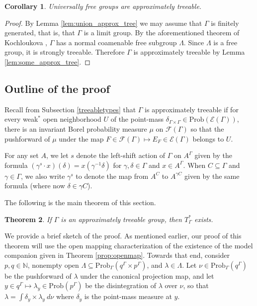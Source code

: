 \documentclass[12pt]{amsart}
\newtheorem{thm}{Theorem}[section]
\newtheorem{cor}[thm]{Corollary}
\theoremstyle{definition}
\def\cal{\mathcal}
\newcommand\bN{{\mathbb N}}
\newcommand{\Prob}{\mathrm{Prob}}
\begin{document}
\begin{cor}
    Universally free groups are approximately treeable.
\end{cor}

\begin{proof}
    By Lemma \ref{lem:union_approx_tree} we may assume that $\Gamma$ is finitely generated, that is, that $\Gamma$ is a limit group.  By the aforementioned theorem of Kochloukova \cite{Kochloukova}, $\Gamma$ has a normal coamenable free subgroup $\Lambda$. Since $\Lambda$ is a free group, it is strongly treeable. Therefore $\Gamma$ is approximately treeable by Lemma \ref{lem:some_approx_tree}.
\end{proof}

\subsection{Outline of the proof}

Recall from Subsection \ref{treeabletypes} that $\Gamma$ is approximately treeable if for every weak$^*$ open neighborhood $U$ of the point-mass $\delta_{\Gamma \times \Gamma} \in \Prob(\cal E(\Gamma))$, there is an invariant Borel probability measure $\mu$ on $\cal F(\Gamma)$ so that the pushforward of $\mu$ under the map $F \in \cal F(\Gamma) \mapsto E_F \in \cal E(\Gamma)$ belongs to $U$.

For any set $A$, we let $s$ denote the left-shift action of $\Gamma$ on $A^\Gamma$ given by the formula $(\gamma^s \cdot x)(\delta) = x(\gamma^{-1} \delta)$ for $\gamma, \delta \in \Gamma$ and $x \in A^\Gamma$. When $C \subseteq \Gamma$ and $\gamma \in \Gamma$, we also write $\gamma^s$ to denote the map from $A^C$ to $A^{\gamma C}$ given by the same formula (where now $\delta \in \gamma C$).

The following is the main theorem of this section.

\begin{thm} \label{thm:approxtree}
	If $\Gamma$ is an approximately treeable group, then $T_\Gamma^*$ exists.
\end{thm}

We provide a brief sketch of the proof. As mentioned earlier, our proof of this theorem will use the open mapping characterization of the existence of the model companion given in Theorem \ref{prop:openmap}. Towards that end, consider $p,q\in \bN$, nonempty open $\Lambda \subseteq \Prob_\Gamma(q^\Gamma \times p^\Gamma)$, and $\lambda \in \Lambda$. Let $\nu \in \Prob_\Gamma(q^\Gamma)$ be the pushforward of $\lambda$ under the canonical projection map, and let $y \in q^\Gamma \mapsto \lambda_y \in \Prob(p^\Gamma)$ be the disintegration of $\lambda$ over $\nu$, so that $\lambda = \int \delta_y \times \lambda_y \ d \nu$ where $\delta_y$ is the point-mass measure at $y$.
\end{document}
